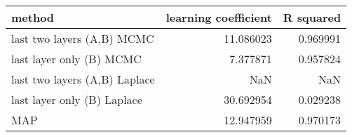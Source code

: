 \begin{tabular}{lrr}
\toprule
                        method &  learning coefficient &  R squared \\
\midrule
    last two layers (A,B) MCMC &             11.086023 &   0.969991 \\
      last layer only (B) MCMC &              7.377871 &   0.957824 \\
 last two layers (A,B) Laplace &                   NaN &        NaN \\
   last layer only (B) Laplace &             30.692954 &   0.029238 \\
                           MAP &             12.947959 &   0.970173 \\
\bottomrule
\end{tabular}
